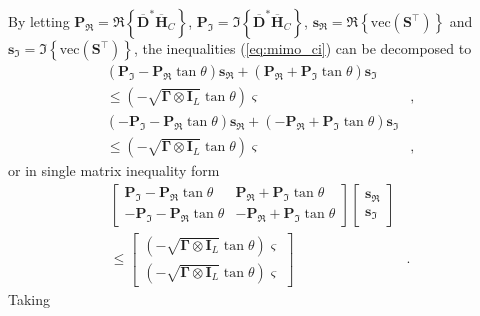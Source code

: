 \documentclass[lettersize,journal]{IEEEtran}
\begin{document}
By letting $\mathbf{P}_{\Re} = \Re\left\{\overline{\mathbf{D}}^{*}\overline{\mathbf{H}}_C\right\}$, $\mathbf{P}_{\Im} = \Im\left\{\overline{\mathbf{D}}^{*}\overline{\mathbf{H}}_C\right\}$, $\mathbf{s}_{\Re} = \Re\left\{\text{vec}(\mathbf{S}^{\top})\right\}$ and $\mathbf{s}_{\Im} = \Im\left\{\text{vec}(\mathbf{S}^{\top})\right\}$, the inequalities (\ref{eq:mimo_ci}) can be decomposed to
\begin{equation}
\begin{aligned}
    (\mathbf{P}_{\Im}-\mathbf{P}_{\Re}\tan\theta)\mathbf{s}_{\Re} + (\mathbf{P}_{\Re}+\mathbf{P}_{\Im}\tan\theta)\mathbf{s}_{\Im}& \\
    \leq (-\sqrt{\mathbf{\Gamma}\otimes\mathbf{I}_L}\tan\theta)\bm{\varsigma}&, \\
    (-\mathbf{P}_{\Im}-\mathbf{P}_{\Re}\tan\theta)\mathbf{s}_{\Re} + (-\mathbf{P}_{\Re}+\mathbf{P}_{\Im}\tan\theta)\mathbf{s}_{\Im}& \\
    \leq (-\sqrt{\mathbf{\Gamma}\otimes\mathbf{I}_L}\tan\theta)\bm{\varsigma}&,
\end{aligned}
\end{equation}
or in single matrix inequality form
\begin{equation}
\label{eq:matrix_ci}
\begin{aligned}
    \begin{bmatrix}
        \mathbf{P}_{\Im}-\mathbf{P}_{\Re}\tan\theta & \mathbf{P}_{\Re}+\mathbf{P}_{\Im}\tan\theta \\
        -\mathbf{P}_{\Im}-\mathbf{P}_{\Re}\tan\theta & -\mathbf{P}_{\Re}+\mathbf{P}_{\Im}\tan\theta
    \end{bmatrix}
    \begin{bmatrix}
        \mathbf{s}_{\Re}\\
        \mathbf{s}_{\Im}
    \end{bmatrix}& \\
    \leq 
    \begin{bmatrix}
        (-\sqrt{\mathbf{\Gamma}\otimes\mathbf{I}_L}\tan\theta)\bm{\varsigma}\\
        (-\sqrt{\mathbf{\Gamma}\otimes\mathbf{I}_L}\tan\theta)\bm{\varsigma}
    \end{bmatrix}&.
\end{aligned}
\end{equation}
Taking
\end{document}
